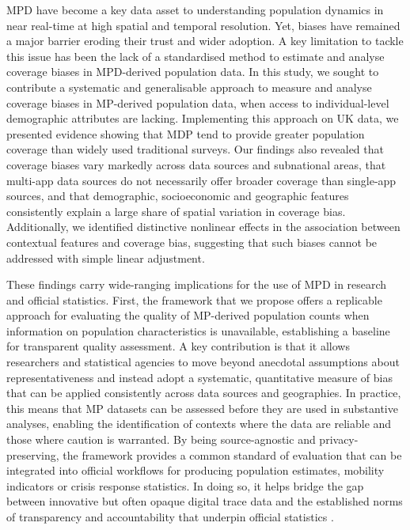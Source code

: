 \documentclass[]{rsos}%
\begin{document}
MPD have become a key data asset to understanding population dynamics in
near real-time at high spatial and temporal resolution. Yet, biases have
remained a major barrier eroding their trust and wider adoption. A key
limitation to tackle this issue has been the lack of a standardised
method to estimate and analyse coverage biases in MPD-derived population
data. In this study, we sought to contribute a systematic and
generalisable approach to measure and analyse coverage biases in
MP-derived population data, when access to individual-level demographic
attributes are lacking. Implementing this approach on UK data, we
presented evidence showing that MDP tend to provide greater population
coverage than widely used traditional surveys. Our findings also
revealed that coverage biases vary markedly across data sources and
subnational areas, that multi-app data sources do not necessarily
offer broader coverage than single-app sources, and that demographic,
socioeconomic and geographic features consistently explain a large share
of spatial variation in coverage bias. Additionally, we identified
distinctive nonlinear effects in the association between contextual
features and coverage bias, suggesting that such biases cannot be
addressed with simple linear adjustment.

These findings carry wide-ranging implications for the use of MPD in
research and official statistics. First, the framework that we propose
offers a replicable approach for evaluating the quality of MP-derived
population counts when information on population characteristics is
unavailable, establishing a baseline for transparent quality assessment.
A key contribution is that it allows researchers and statistical
agencies to move beyond anecdotal assumptions about representativeness
and instead adopt a systematic, quantitative measure of bias that can be
applied consistently across data sources and geographies. In practice,
this means that MP datasets can be assessed before they are used in
substantive analyses, enabling the identification of contexts where the
data are reliable and those where caution is warranted. By being
source-agnostic and privacy-preserving, the framework provides a common
standard of evaluation that can be integrated into official workflows
for producing population estimates, mobility indicators or crisis
response statistics. In doing so, it helps bridge the gap between
innovative but often opaque digital trace data and the established norms
of transparency and accountability that underpin official statistics
\citep{unstatsMPDMS2025}.
\end{document}
